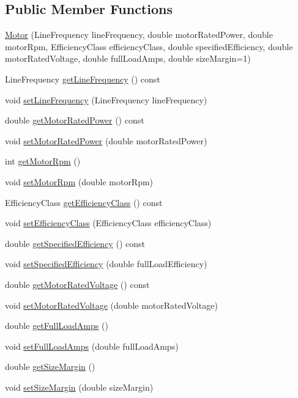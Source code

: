 \subsection*{Public Member Functions}
\begin{DoxyCompactItemize}
\item 
\hyperlink{class_motor_a529cb2685eef1f83ae6a775dd5e50ad9}{Motor} (Line\+Frequency line\+Frequency, double motor\+Rated\+Power, double motor\+Rpm, Efficiency\+Class efficiency\+Class, double specified\+Efficiency, double motor\+Rated\+Voltage, double full\+Load\+Amps, double size\+Margin=1)
\item 
Line\+Frequency \hyperlink{class_motor_a41e71462fe60674a5554e47d0079b0f3}{get\+Line\+Frequency} () const
\item 
void \hyperlink{class_motor_a450e5ecea25b05413b731379f153c3f1}{set\+Line\+Frequency} (Line\+Frequency line\+Frequency)
\item 
double \hyperlink{class_motor_a476d3790492959945b3b75d1638f737f}{get\+Motor\+Rated\+Power} () const
\item 
void \hyperlink{class_motor_aa01f82db13c71b045b05e49f42ba46e9}{set\+Motor\+Rated\+Power} (double motor\+Rated\+Power)
\item 
int \hyperlink{class_motor_a13826c93b894d699478e34a98ffb35ab}{get\+Motor\+Rpm} ()
\item 
void \hyperlink{class_motor_ac0fda674bd40e24bb864e8256fb5ba32}{set\+Motor\+Rpm} (double motor\+Rpm)
\item 
Efficiency\+Class \hyperlink{class_motor_a5d0078bdc164e5ed14334373f183be55}{get\+Efficiency\+Class} () const
\item 
void \hyperlink{class_motor_afa82df266d74ccfed49bf592b5b6526f}{set\+Efficiency\+Class} (Efficiency\+Class efficiency\+Class)
\item 
double \hyperlink{class_motor_aca202d3c2061bd8c19e1819331033e36}{get\+Specified\+Efficiency} () const
\item 
void \hyperlink{class_motor_a0a096ec5fc2b7e8ee40b4e7b30e5f337}{set\+Specified\+Efficiency} (double full\+Load\+Efficiency)
\item 
double \hyperlink{class_motor_a3fedfc960a6970508b39999c58d44cc6}{get\+Motor\+Rated\+Voltage} () const
\item 
void \hyperlink{class_motor_aab754019236e34cba0acd3632567515e}{set\+Motor\+Rated\+Voltage} (double motor\+Rated\+Voltage)
\item 
double \hyperlink{class_motor_a612eb0dabb9623ee8e0866046527d16a}{get\+Full\+Load\+Amps} ()
\item 
void \hyperlink{class_motor_a4bc8bf85c7749a0b7ff279d7eef20a2e}{set\+Full\+Load\+Amps} (double full\+Load\+Amps)
\item 
double \hyperlink{class_motor_aff485f55bed5b58d1454ce5c71bc0729}{get\+Size\+Margin} ()
\item 
void \hyperlink{class_motor_ab39a9375d17af151b6f9516674f37928}{set\+Size\+Margin} (double size\+Margin)
\end{DoxyCompactItemize}


